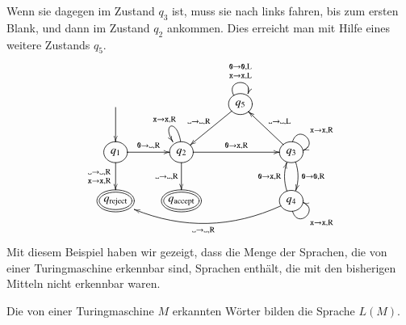 Wenn sie dagegen im Zustand $q_3$ ist, muss sie nach links fahren,
bis zum ersten Blank, und dann im Zustand $q_2$ ankommen. Dies erreicht
man mit Hilfe eines weitere Zustands $q_5$.
\[
\entrymodifiers={++[o][F]}
\xymatrix{
*+\txt{}\ar[d]
	&*+\txt{}
		&{q_5}\ar@(ul,ur)^{\genfrac{}{}{0pt}{1}{\texttt{0}\to \texttt{0},\text{L}}{{\tt x}\to {\tt x},\text{L}}}
		      \ar[dl]_{\blank\to\blank,\text{R}}
\\
{q_1}\ar[d]_{\genfrac{}{}{0pt}{1}{\blank\to\blank,\text{R}}{{\tt x}\to{\tt x},\text{R}}}
	\ar[r]^{\texttt{0}\to\blank,\text{R}}
	&{q_2}\ar[d]_{\blank\to\blank,\text{R}}
	      \ar[rr]^{\texttt{0}\to{\tt x},\text{R}}
              \ar@(u,ul)_{{\tt x}\to {\tt x},\text{R}}
		&*+\txt{}
			&{q_3}\ar@(u,r)^{{\tt x}\to{\tt x},\text{R}}
			      \ar@/^/[d]^{\texttt{0}\to \texttt{0},\text{R}}
			      \ar[ul]_{\blank\to\blank,\text{L}}
\\
*++[o][F=]{q_\text{reject}}
	&*++[o][F=]{q_\text{accept}}
		&*+\txt{}
			&{q_4}\ar@/^/[u]^{\texttt{0}\to {\tt x},\text{R}}
			      \ar@(d,r)_{{\tt x}\to{\tt x},\text{R}}
			      \ar@/^20pt/[lll]^{\blank\to\blank,\text{R}}
}
\]
Mit diesem Beispiel haben wir gezeigt, dass die Menge der
Sprachen, die von einer Turingmaschine erkennbar sind, Sprachen
enthält, die mit den bisherigen Mitteln nicht erkennbar waren.

\begin{definition}
Die von einer Turingmaschine $M$ erkannten Wörter bilden die
Sprache $L(M)$.
\end{definition}

